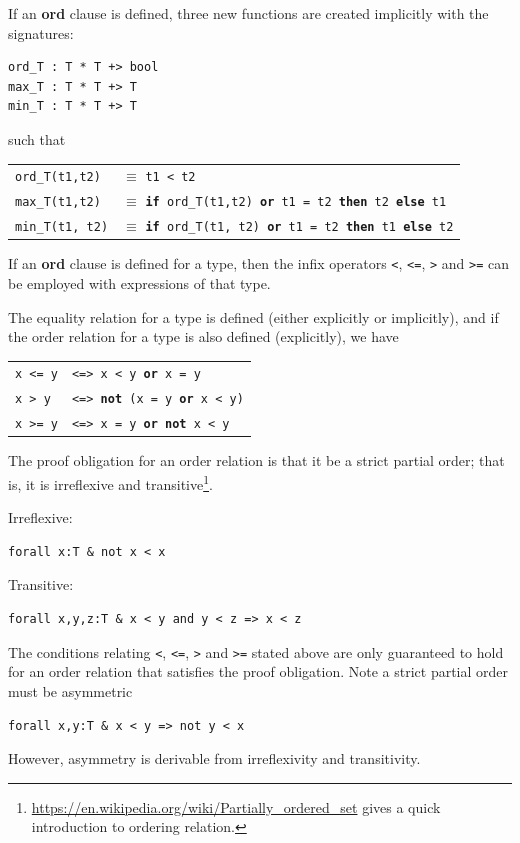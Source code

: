 \documentclass{overturerepchap}
\newcommand{\keyw}[1]{{\bf\ttfamily #1}}
\begin{document}
If an \keyw{ord} clause is defined, three new functions are created implicitly with the signatures:
\begin{lstlisting}
ord_T : T * T +> bool
max_T : T * T +> T
min_T : T * T +> T
\end{lstlisting}
         such that

\begin{tabular}{l l}
{\tt ord\_T(t1,t2)} & $\equiv$ {\tt t1 < t2} \\
{\tt max\_T(t1,t2)} & $\equiv$ {\tt  \keyw{if} ord\_T(t1,t2)  \keyw{or} t1 = t2  \keyw{then} t2  \keyw{else} t1}\\
{\tt min\_T(t1, t2)} & $\equiv$ {\tt  \keyw{if} ord\_T(t1, t2)  \keyw{or} t1 = t2  \keyw{then} t1  \keyw{else} t2}\\
\end{tabular}

If an  \keyw{ord} clause is defined for a type, then the infix operators {\tt <}, {\tt <=}, {\tt >} and {\tt >=} can be employed with expressions of that type.

The equality relation for a type is defined (either explicitly or implicitly), and if the order relation for a type is also defined (explicitly), we have

\begin{tabular}{l l }
{\tt x <= y} & {\tt <=> x < y  \keyw{or} x = y} \\
{\tt x > y} & {\tt <=>  \keyw{not} (x = y  \keyw{or} x < y)} \\
{\tt x >= y} & {\tt <=>  x = y  \keyw{or}  \keyw{not} x < y}\\
\end{tabular}

The proof obligation for an order relation is that it be a strict partial order; that is, it is irreflexive and transitive\footnote{\url{https://en.wikipedia.org/wiki/Partially_ordered_set} gives a quick introduction to ordering relation.}.
\begin{description}
\item Irreflexive:
\begin{lstlisting}
forall x:T & not x < x 
\end{lstlisting}
\item Transitive:
\begin{lstlisting}
forall x,y,z:T & x < y and y < z => x < z
\end{lstlisting}

The conditions relating {\tt <}, {\tt <=}, {\tt >} and {\tt >=} stated above are only guaranteed to hold for an order relation that satisfies the proof obligation. 
Note a strict partial order must be asymmetric
\begin{lstlisting}
forall x,y:T & x < y => not y < x
\end{lstlisting}
However, asymmetry is derivable from irreflexivity and transitivity.
\end{description}
\end{document}
